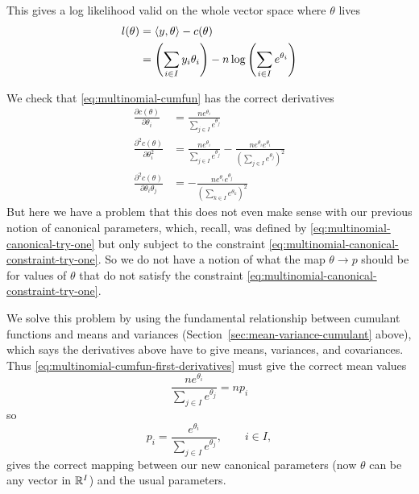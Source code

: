 This gives a log likelihood valid on the whole vector space where
$\theta$ lives
\begin{equation} \label{eq:multinomial-logl}
\begin{split}
   l(\theta) & = \langle y, \theta \rangle - c(\theta)
   \\
   & = \left( \sum_{i \in I} y_i \theta_i \right)
   - n \log \left( \sum_{i \in I} e^{\theta_i} \right)
\end{split}
\end{equation}

We check that \eqref{eq:multinomial-cumfun} has the correct derivatives
\begin{subequations}
\begin{align}
   \frac{\partial c(\theta)}{\partial \theta_i}
   & = 
   \frac{n e^{\theta_i}}{\sum_{j \in I} e^{\theta_j}}
   \label{eq:multinomial-cumfun-first-derivatives}
   \\
   \frac{\partial^2 c(\theta)}{\partial \theta_i^2}
   & = 
   \frac{n e^{\theta_i}}{\sum_{j \in I} e^{\theta_j}}
   -
   \frac{n e^{\theta_i} e^{\theta_i}}
   {\left( \sum_{j \in I} e^{\theta_j} \right)^2}
   \label{eq:multinomial-cumfun-second-derivatives-diagonal}
   \\
   \frac{\partial^2 c(\theta)}{\partial \theta_i \theta_j}
   & = 
   -
   \frac{n e^{\theta_i} e^{\theta_j}}
   {\left( \sum_{k \in I} e^{\theta_k} \right)^2}
   \label{eq:multinomial-cumfun-second-derivatives-off-diagonal}
\end{align}
\end{subequations}
But here we have a problem that this does not even make sense with our
previous notion of canonical parameters, which, recall, was defined
by \eqref{eq:multinomial-canonical-try-one} but only subject to the
constraint \eqref{eq:multinomial-canonical-constraint-try-one}.
So we do not have a notion of what the map $\theta \to p$ should be
for values of $\theta$ that do not satisfy the
constraint \eqref{eq:multinomial-canonical-constraint-try-one}.

We solve this problem by using the fundamental relationship between
cumulant functions and means and variances
(Section~\ref{sec:mean-variance-cumulant} above), which says the
derivatives above have to give means, variances, and covariances.
Thus \eqref{eq:multinomial-cumfun-first-derivatives} must
give the correct mean values
$$
   \frac{n e^{\theta_i}}{\sum_{j \in I} e^{\theta_j}} = n p_i
$$
so
\begin{equation} \label{eq:multinomial-canonical-to-usual}
   p_i = \frac{e^{\theta_i}}{\sum_{j \in I} e^{\theta_j}}, \qquad i \in I,
\end{equation}
gives the correct mapping between our new canonical parameters (now
$\theta$ can be any vector in $\mathbb{R}^I$) and the usual parameters.

